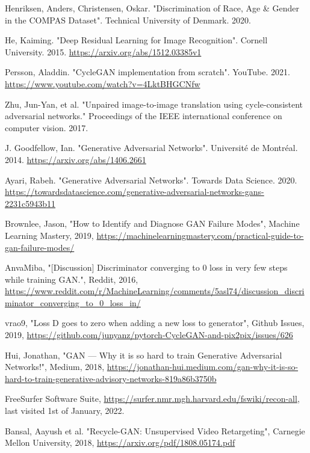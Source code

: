 \documentclass[11pt, fleqn, titlepage]{article}
\newcommand{\1}[1]{\mathds{1}\left[#1\right]}
\begin{document}
\begin{thebibliography}{9}
		 Henriksen, Anders, Christensen, Oskar. "Discrimination of Race, Age \& Gender in the COMPAS Dataset". Technical University of Denmark. 2020.
		
		 He, Kaiming. "Deep Residual Learning for Image Recognition". Cornell University. 2015. \url{https://arxiv.org/abs/1512.03385v1}
	
		 Persson, Aladdin. "CycleGAN implementation from scratch". YouTube. 2021.  \url{https://www.youtube.com/watch?v=4LktBHGCNfw}
	
		 Zhu, Jun-Yan, et al. "Unpaired image-to-image translation using cycle-consistent adversarial networks." Proceedings of the IEEE international conference on computer vision. 2017.
		
		 J. Goodfellow, Ian. "Generative Adversarial Networks". Université de Montréal. 2014. \url{https://arxiv.org/abs/1406.2661}
		
		 Ayari, Rabeh. "Generative Adversarial Networks". Towards Data Science. 2020. \url{https://towardsdatascience.com/generative-adversarial-networks-gans-2231c5943b11}
		
		 Brownlee, Jason, "How to Identify and Diagnose GAN Failure Modes", Machine Learning Mastery, 2019, \url{https://machinelearningmastery.com/practical-guide-to-gan-failure-modes/}
		
		 AnvaMiba, "[Discussion] Discriminator converging to 0 loss in very few steps while training GAN.", Reddit, 2016, \url{https://www.reddit.com/r/MachineLearning/comments/5asl74/discussion\_discriminator\_converging\_to\_0\_loss\_in/}
		
		 vrao9, "Loss D goes to zero when adding a new loss to generator", Github Issues, 2019, \url{https://github.com/junyanz/pytorch-CycleGAN-and-pix2pix/issues/626}
		
		 Hui, Jonathan, "GAN — Why it is so hard to train Generative Adversarial Networks!", Medium, 2018, \url{https://jonathan-hui.medium.com/gan-why-it-is-so-hard-to-train-generative-advisory-networks-819a86b3750b}
		
		 FreeSurfer Software Suite, \url{https://surfer.nmr.mgh.harvard.edu/fswiki/recon-all}, last visited 1st of January, 2022.

		 Bansal, Aayush et al. "Recycle-GAN: Unsupervised Video Retargeting", Carnegie Mellon University, 2018, \url{https://arxiv.org/pdf/1808.05174.pdf}
		

\end{thebibliography}
\end{document}
